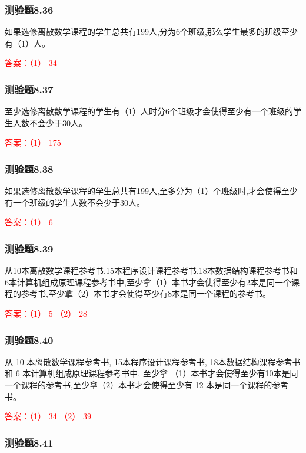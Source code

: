 \documentclass[UTF8, heading=true]{ctexart}
\begin{document}
\subsubsection{测验题8.36}
如果选修离散数学课程的学生总共有199人,分为6个班级,那么学生最多的班级至少有（1）人。

\textcolor{red}{答案：（1） 34}

\subsubsection{测验题8.37}

至少选修离散数学课程的学生有（1）人时分6个班级才会使得至少有一个班级的学生人数不会少于30人。

\textcolor{red}{答案：（1） 175}

\subsubsection{测验题8.38}

如果选修离散数学课程的学生总共有199人,至多分为（1）个班级时,才会使得至少有一个班级的学生人数不会少于30人。

\textcolor{red}{答案：（1） 6}


\subsubsection{测验题8.39}

从10本离散数学课程参考书,15本程序设计课程参考书,18本数据结构课程参考书和6本计算机组成原理课程参考书中,至少拿（1）本书才会使得至少有2本是同一个课程的参考书,至少拿（2）本书才会使得至少有8本是同一个课程的参考书。

\textcolor{red}{答案：（1） 5 （2） 28}

\subsubsection{测验题8.40}

从 10 本离散数学课程参考书, 15本程序设计课程参考书, 18本数据结构课程参考书和 6 本计算机组成原理课程参考书中, 至少拿
（1）本书才会使得至少有10本是同一个课程的参考书,至少拿（2）本书才会使得至少有 12 本是同一个课程的参考书。

\textcolor{red}{答案：（1） 34 （2） 39}

\subsubsection{测验题8.41}
\end{document}

